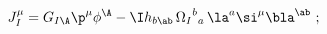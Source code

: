 \begin{equation} \label{current}
  J^\mu_I = G_{I\A} \p^\mu \phi^\A - \I h_{b\ab}\, {\Omega_I}^b{}_a\,
  \la^a \si^\mu \bla^\ab\ ;
 \end{equation}

